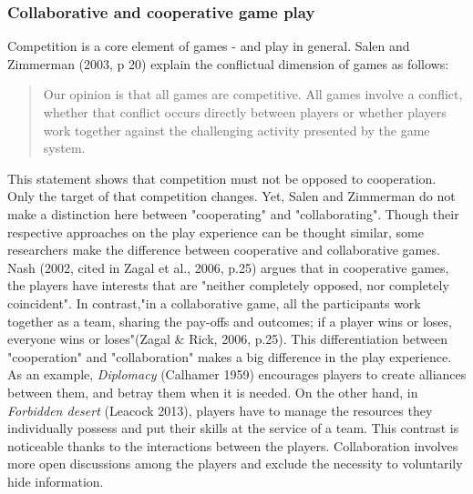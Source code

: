 \subsubsection{Collaborative and cooperative game play}
Competition is a core element of games - and play in general. Salen and Zimmerman (2003, p 20) explain the conflictual dimension of games as follows:
\begin{quotation}
Our opinion is that all games are competitive. All games involve a conflict, whether that conflict occurs
directly between players or whether players work together against the challenging activity presented by the
game system.
\end{quotation}
This statement shows that competition must not be opposed to cooperation. Only the target of that competition changes. Yet, Salen and Zimmerman do not make a distinction here between "cooperating" and "collaborating". Though their respective approaches on the play experience can be thought similar, some researchers make the difference between cooperative and collaborative games. Nash (2002, cited in Zagal et al., 2006, p.25) argues that in cooperative games, the players have interests that are "neither completely opposed, nor completely coincident". In contrast,"in a collaborative game, all the participants work together as a team, sharing the pay-offs and outcomes; if a player wins or loses, everyone wins or loses"(Zagal \& Rick, 2006, p.25). This differentiation between "cooperation" and "collaboration" makes a big difference in the play experience. As an example, \textit{Diplomacy} (Calhamer 1959) encourages players to create alliances between them, and betray them when it is needed. On the other hand, in \textit{Forbidden desert} (Leacock 2013), players have to manage the resources they individually possess and put their skills at the service of a team. 
This contrast is noticeable thanks to the interactions between the players. Collaboration involves more open discussions among the players and exclude the necessity to voluntarily hide information.
